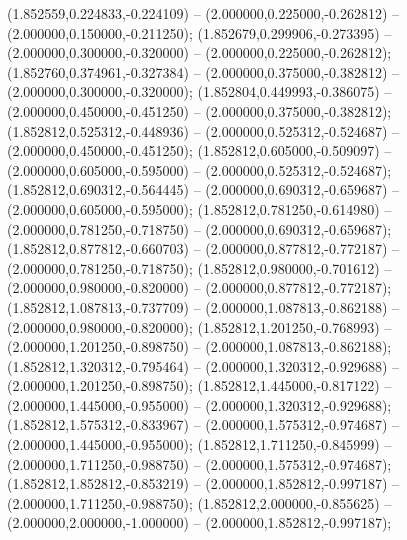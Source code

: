 (1.852559,0.224833,-0.224109) -- (2.000000,0.225000,-0.262812) -- (2.000000,0.150000,-0.211250);
 (1.852679,0.299906,-0.273395) -- (2.000000,0.300000,-0.320000) -- (2.000000,0.225000,-0.262812);
 (1.852760,0.374961,-0.327384) -- (2.000000,0.375000,-0.382812) -- (2.000000,0.300000,-0.320000);
 (1.852804,0.449993,-0.386075) -- (2.000000,0.450000,-0.451250) -- (2.000000,0.375000,-0.382812);
 (1.852812,0.525312,-0.448936) -- (2.000000,0.525312,-0.524687) -- (2.000000,0.450000,-0.451250);
 (1.852812,0.605000,-0.509097) -- (2.000000,0.605000,-0.595000) -- (2.000000,0.525312,-0.524687);
 (1.852812,0.690312,-0.564445) -- (2.000000,0.690312,-0.659687) -- (2.000000,0.605000,-0.595000);
 (1.852812,0.781250,-0.614980) -- (2.000000,0.781250,-0.718750) -- (2.000000,0.690312,-0.659687);
 (1.852812,0.877812,-0.660703) -- (2.000000,0.877812,-0.772187) -- (2.000000,0.781250,-0.718750);
 (1.852812,0.980000,-0.701612) -- (2.000000,0.980000,-0.820000) -- (2.000000,0.877812,-0.772187);
 (1.852812,1.087813,-0.737709) -- (2.000000,1.087813,-0.862188) -- (2.000000,0.980000,-0.820000);
 (1.852812,1.201250,-0.768993) -- (2.000000,1.201250,-0.898750) -- (2.000000,1.087813,-0.862188);
 (1.852812,1.320312,-0.795464) -- (2.000000,1.320312,-0.929688) -- (2.000000,1.201250,-0.898750);
 (1.852812,1.445000,-0.817122) -- (2.000000,1.445000,-0.955000) -- (2.000000,1.320312,-0.929688);
 (1.852812,1.575312,-0.833967) -- (2.000000,1.575312,-0.974687) -- (2.000000,1.445000,-0.955000);
 (1.852812,1.711250,-0.845999) -- (2.000000,1.711250,-0.988750) -- (2.000000,1.575312,-0.974687);
 (1.852812,1.852812,-0.853219) -- (2.000000,1.852812,-0.997187) -- (2.000000,1.711250,-0.988750);
 (1.852812,2.000000,-0.855625) -- (2.000000,2.000000,-1.000000) -- (2.000000,1.852812,-0.997187);
